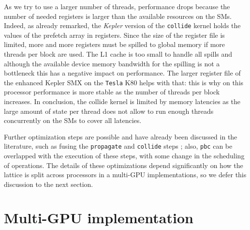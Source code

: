 \documentclass{elsarticle}
\begin{document}
As we try to use a larger number of threads, performance drops because the 
number of needed registers is larger than the available resources on the SMs.
%
%
%
Indeed, as already remarked, the {\em Kepler} version of the {\tt collide} 
kernel holds the values of the prefetch array in registers. Since the size of 
the register file is limited, more and more 
registers must be spilled to global memory if more threads per block are used. 
The L1 cache is too small to handle all spills and although the available device 
memory bandwidth for the spilling is not a bottleneck this has a negative impact 
on performance. 
%
%
%
The larger register file of the enhanced Kepler SMX on the {\tt Tesla} K80 helps with that: 
this is why on this processor performance is more stable as the number 
of threads per block increases.
%
%
In conclusion, the collide kernel is limited by memory latencies as the 
large amount of state per thread does not allow to run enough threads 
concurrently on the SMs to cover all latencies.

Further optimization steps are possible and have already been discussed in the 
literature, such as fusing the {\tt propagate} and {\tt collide} steps
\cite{Wittmann}; 
also, {\tt pbc} can be overlapped with the execution of these steps, with some 
change in the scheduling of operations. The details of these optimizations 
depend significantly on how the lattice is split across processors in a 
multi-GPU implementations, so we defer this discussion to the next section.
   
\section{Multi-GPU implementation}
\end{document}
